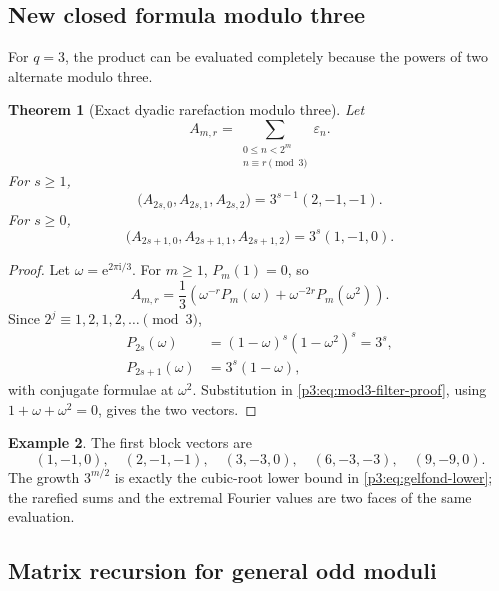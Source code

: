 \documentclass[11pt,oneside]{article}
\newtheorem{theorem}{Theorem}[section]
\theoremstyle{definition}
\newtheorem{example}[theorem]{Example}
\theoremstyle{remark}
\newcommand{\e}{\mathrm e}
\newcommand{\ii}{\mathrm i}
\newcommand{\eps}{\varepsilon}
\begin{document}
\subsection{New closed formula modulo three}

For $q=3$, the product can be evaluated completely because the powers of two
alternate modulo three.

\begin{theorem}[Exact dyadic rarefaction modulo three]\label{p3:thm:mod3-rarefaction}
Let
\begin{equation}\label{p3:eq:A-mr3}
 A_{m,r}=\sum_{\substack{0\le n<2^m\\n\equiv r\pmod3}}\eps_n.
\end{equation}
For $s\ge1$,
\begin{equation}\label{p3:eq:mod3-even-block}
 \bigl(A_{2s,0},A_{2s,1},A_{2s,2}\bigr)
 =3^{s-1}(2,-1,-1).
\end{equation}
For $s\ge0$,
\begin{equation}\label{p3:eq:mod3-odd-block}
 \bigl(A_{2s+1,0},A_{2s+1,1},A_{2s+1,2}\bigr)
 =3^s(1,-1,0).
\end{equation}
\end{theorem}

\begin{proof}
Let $\omega=\e^{2\pi\ii/3}$.  For $m\ge1$, $P_m(1)=0$, so
\begin{equation}\label{p3:eq:mod3-filter-proof}
 A_{m,r}=\frac13\left(
  \omega^{-r}P_m(\omega)+\omega^{-2r}P_m(\omega^2)
 \right).
\end{equation}
Since $2^j\equiv1,2,1,2,\ldots\pmod3$,
\begin{align*}
 P_{2s}(\omega)
 &=(1-\omega)^s(1-\omega^2)^s=3^s,\\
 P_{2s+1}(\omega)
 &=3^s(1-\omega),
\end{align*}
with conjugate formulae at $\omega^2$.  Substitution in
\cref{p3:eq:mod3-filter-proof}, using $1+\omega+\omega^2=0$, gives the two
vectors.
\end{proof}

\begin{example}
The first block vectors are
\[
 (1,-1,0),\quad(2,-1,-1),\quad(3,-3,0),\quad(6,-3,-3),
 \quad(9,-9,0).
\]
The growth $3^{m/2}$ is exactly the cubic-root lower bound in
\cref{p3:eq:gelfond-lower}; the rarefied sums and the extremal Fourier values are
two faces of the same evaluation.
\end{example}

\subsection{Matrix recursion for general odd moduli}
\end{document}
